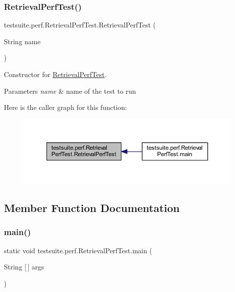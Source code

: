 \subsubsection{\texorpdfstring{Retrieval\+Perf\+Test()}{RetrievalPerfTest()}}
{\footnotesize\ttfamily testsuite.\+perf.\+Retrieval\+Perf\+Test.\+Retrieval\+Perf\+Test (\begin{DoxyParamCaption}\item[{String}]{name }\end{DoxyParamCaption})}

Constructor for \mbox{\hyperlink{classtestsuite_1_1perf_1_1_retrieval_perf_test}{Retrieval\+Perf\+Test}}.


\begin{DoxyParams}{Parameters}
{\em name} & name of the test to run \\
\hline
\end{DoxyParams}
Here is the caller graph for this function\+:
\nopagebreak
\begin{figure}[H]
\begin{center}
\leavevmode
\includegraphics[width=350pt]{classtestsuite_1_1perf_1_1_retrieval_perf_test_abfe4d6c49777d60f2cb249cb5f72ef0d_icgraph}
\end{center}
\end{figure}


\subsection{Member Function Documentation}
\mbox{\label{classtestsuite_1_1perf_1_1_retrieval_perf_test_afb26b964fc63ebfdc34ed46e47a88ca5}} 
\subsubsection{\texorpdfstring{main()}{main()}}
{\footnotesize\ttfamily static void testsuite.\+perf.\+Retrieval\+Perf\+Test.\+main (\begin{DoxyParamCaption}\item[{String \mbox{[}$\,$\mbox{]}}]{args }\end{DoxyParamCaption})\hspace{0.3cm}{\ttfamily [static]}}

